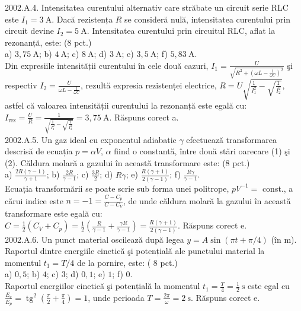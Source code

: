 2002.A.4. Intensitatea curentului alternativ care străbate un circuit serie RLC este $I_{1}=3 \mathrm{~A}$. Dacă rezistența $R$ se consideră nulă, intensitatea curentului prin circuit devine $I_{2}=5 \mathrm{~A}$. Intensitatea curentului prin circuitul RLC, aflat la rezonanță, este: (8 pct.)\\ a) $3,75 \mathrm{~A}$; b) $4 \mathrm{~A}$; c) $8 \mathrm{~A}$; d) $3 \mathrm{~A}$; e) $3,5 \mathrm{~A}$; f) $5,83 \mathrm{~A}$.\\ Din expresiile intensității curentului în cele două cazuri, $I_{1}=\frac{U}{\sqrt{R^{2}+\left(\omega L-\frac{1}{\omega C}\right)^{2}}}$ şi respectiv $I_{2}=\frac{U}{\omega L-\frac{1}{\omega C}}$, rezultă expresia rezistenței electrice, $R=U \sqrt{\frac{1}{I_{1}^{2}}-\sqrt{\frac{1}{I_{2}^{2}}}}$, astfel că valoarea intensității curentului la rezonanță este egală cu:\\ $I_{\text {rez}}=\frac{U}{R}=\frac{1}{\sqrt{\frac{1}{I_{1}^{2}}-\sqrt{\frac{1}{I_{2}^{2}}}}}=3,75 \mathrm{~A}$. Răspuns corect a.\\

2002.A.5. Un gaz ideal cu exponentul adiabatic $\gamma$ efectuează transformarea descrisă de ecuația $p=\alpha V$, $\alpha$ fiind o constantă, între două stări oarecare (1) şi (2). Căldura molară a gazului în această transformare este: (8 pct.)\\ a) $\frac{2 R(\gamma-1)}{\gamma+1}$; b) $\frac{2 R}{\gamma-1}$; c) $\frac{3 R}{2}$; d) $R \gamma$; e) $\frac{R(\gamma+1)}{2(\gamma-1)}$; f) $\frac{R \gamma}{\gamma-1}$.\\ Ecuația transformării se poate scrie sub forma unei politrope, $p V^{-1}=$ const., a cărui indice este $n=-1=\frac{C-C_{p}}{C-C_{V}}$, de unde căldura molară la gazului în această transformare este egală cu:\\ $C=\frac{1}{2}\left(C_{V}+C_{p}\right)=\frac{1}{2}\left(\frac{R}{\gamma-1}+\frac{\gamma R}{\gamma-1}\right)=\frac{R(\gamma+1)}{2(\gamma-1)}$. Răspuns corect e.\\

2002.A.6. Un punct material oscilează după legea $y=A \sin (\pi t+\pi / 4)$ (în m). Raportul dintre energiile cinetică şi potențială ale punctului material la momentul $t_{1}=T / 4$ de la pornire, este: ( 8 pct.)\\ a) $0,5$; b) $4$; c) $3$; d) $0,1$; e) $1$; f) $0$.\\ Raportul energiilor cinetică şi potențială la momentul $t_{1}=\frac{T}{4}=\frac{1}{2} \mathrm{~s}$ este egal cu $\frac{E_{c}}{E_{p}}=\operatorname{tg}^{2}\left(\frac{\pi}{2}+\frac{\pi}{4}\right)=1$, unde perioada $T=\frac{2 \pi}{\omega}=2 \mathrm{~s}$. Răspuns corect e.\\

